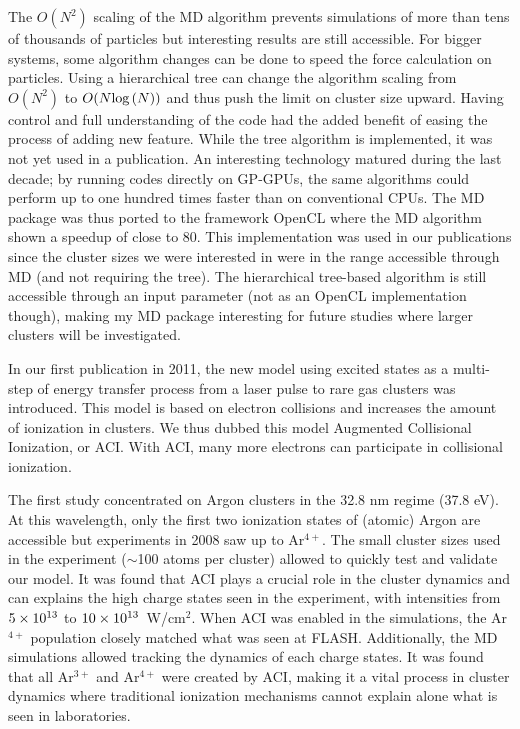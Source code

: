 The $O(N^2)$ scaling of the MD algorithm prevents simulations of more than tens
of thousands of particles but interesting results are still accessible.
For bigger systems, some algorithm changes can be done to speed the force
calculation on particles. Using a hierarchical tree can change the algorithm
scaling from $O(N^2)$ to $O(N \textrm{log}\left( N \right))$ and thus push the limit on
cluster size upward. Having control and full understanding of the code had
the added benefit of easing the process of adding new feature. While the tree
algorithm is implemented, it was not yet used in a publication. An interesting
technology matured during the last decade; by running codes directly on GP-GPUs,
the same algorithms could perform up to one hundred times faster than on
conventional CPUs. The MD package was thus ported to the framework OpenCL where
the MD algorithm shown a speedup of close to 80. This implementation was used
in our publications since the cluster sizes we were interested in were
in the range accessible through MD (and not requiring the tree). The
hierarchical tree-based algorithm is still accessible through an input parameter
(not as an OpenCL implementation though), making my MD package interesting for
future studies where larger clusters will be investigated.

In our first publication in 2011, the new model using excited states as a
multi-step of energy transfer process from a laser pulse to rare gas clusters
was introduced. This model is based on electron collisions and increases the
amount of ionization in clusters. We thus dubbed this model Augmented
Collisional Ionization, or ACI. With ACI, many more electrons can participate in
collisional ionization.

The first study concentrated on Argon clusters in the 32.8 nm regime (37.8 eV).
At this wavelength, only the first two ionization states of (atomic) Argon are
accessible but experiments in 2008 saw up to Ar$^{4+}$. The small cluster sizes
used in the experiment ($\sim$100 atoms per cluster) allowed to quickly test and
validate our model. It was found that ACI plays a crucial role in the cluster
dynamics and can explains the high charge states seen in the experiment, with
intensities from $\ten{5}{13}$ to $\ten{10}{13}$~W/cm$^{2}$. When ACI was
enabled in the simulations, the Ar$^{4+}$ population closely matched what was
seen at FLASH. Additionally, the MD simulations allowed tracking the dynamics
of each charge states. It was found that all Ar$^{3+}$ and Ar$^{4+}$ were
created by ACI, making it a vital process in cluster dynamics where traditional
ionization mechanisms cannot explain alone what is seen in laboratories.

